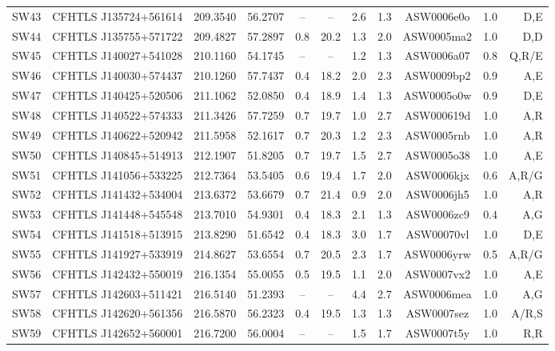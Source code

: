 \documentclass[useAMS,usenatbib,a4paper]{mn2e}
\begin{document}
\begin{center}
\begin{longtable}{lcccccccccr}
SW43 & CFHTLS J135724+561614 &  209.3540 &   56.2707 &  --  &  --  &  2.6 &  1.3 & ASW0006e0o &  1.0  &  D,E   \\ 
SW44 & CFHTLS J135755+571722 &  209.4827 &   57.2897 &  0.8 & 20.2 &  1.3 &  2.0 & ASW0005ma2 &  1.0  &  D,D   \\ 
SW45 & CFHTLS J140027+541028 &  210.1160 &   54.1745 &  --  &  --  &  1.2 &  1.3 & ASW0006a07 &  0.8  &  Q,R/E   \\ 
SW46 & CFHTLS J140030+574437 &  210.1260 &   57.7437 &  0.4 & 18.2 &  2.0 &  2.3 & ASW0009bp2 &  0.9  &  A,E   \\ 
SW47 & CFHTLS J140425+520506 &  211.1062 &   52.0850 &  0.4 & 18.9 &  1.4 &  1.3 & ASW0005o0w &  0.9  &  D,E   \\ 
SW48 & CFHTLS J140522+574333 &  211.3426 &   57.7259 &  0.7 & 19.7 &  1.0 &  2.7 & ASW000619d &  1.0  &  A,R   \\ 
SW49 & CFHTLS J140622+520942 &  211.5958 &   52.1617 &  0.7 & 20.3 &  1.2 &  2.3 & ASW0005rnb &  1.0  &  A,R   \\ 
SW50 & CFHTLS J140845+514913 &  212.1907 &   51.8205 &  0.7 & 19.7 &  1.5 &  2.7 & ASW0005o38 &  1.0  &  A,E   \\ 
SW51 & CFHTLS J141056+533225 &  212.7364 &   53.5405 &  0.6 & 19.4 &  1.7 &  2.0 & ASW0006kjx &  0.6  &  A,R/G   \\ 
SW52 & CFHTLS J141432+534004 &  213.6372 &   53.6679 &  0.7 & 21.4 &  0.9 &  2.0 & ASW0006jh5 &  1.0  &  A,R   \\ 
SW53 & CFHTLS J141448+545548 &  213.7010 &   54.9301 &  0.4 & 18.3 &  2.1 &  1.3 & ASW0006zc9 &  0.4  &  A,G   \\ 
SW54 & CFHTLS J141518+513915 &  213.8290 &   51.6542 &  0.4 & 18.3 &  3.0 &  1.7 & ASW00070vl &  1.0  &  D,E   \\ 
SW55 & CFHTLS J141927+533919 &  214.8627 &   53.6554 &  0.7 & 20.5 &  2.3 &  1.7 & ASW0006yrw &  0.5  &  A,R/G   \\ 
SW56 & CFHTLS J142432+550019 &  216.1354 &   55.0055 &  0.5 & 19.5 &  1.1 &  2.0 & ASW0007vx2 &  1.0  &  A,E   \\ 
SW57 & CFHTLS J142603+511421 &  216.5140 &   51.2393 &  --  &  --  &  4.4 &  2.7 & ASW0006mea &  1.0  &  A,G   \\ 
SW58 & CFHTLS J142620+561356 &  216.5870 &   56.2323 &  0.4 & 19.5 &  1.3 &  1.3 & ASW0007sez &  1.0  &  A/R,S   \\ 
SW59 & CFHTLS J142652+560001 &  216.7200 &   56.0004 &  --  &  --  &  1.5 &  1.7 & ASW0007t5y &  1.0  &  R,R   \\ 

\end{longtable}
\end{center}
\end{document}
